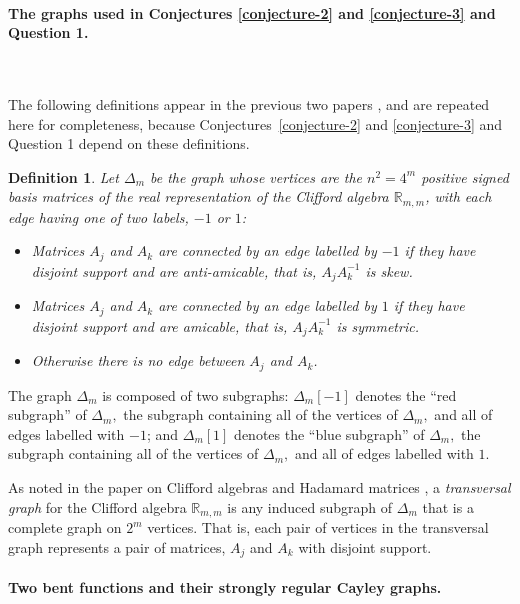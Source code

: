 \documentclass[12pt,a4paper]{article}
\newcommand{\mb}[1]{\mathbb{#1}}
\newcommand{\R}{\mb{R}}
\newtheorem{Definition}{Definition}
\begin{document}
\paragraph*{The graphs used in Conjectures \ref{conjecture-2} and \ref{conjecture-3} and Question 1.}
\label{sec-Graphs}

~

The following definitions appear in the previous two papers \cite{Leo14Constructions,Leo15Bent},
and are repeated here for completeness, because Conjectures~\ref{conjecture-2} and \ref{conjecture-3} and Question 1 depend on these definitions.

\begin{Definition}\label{definition-delta}
Let $\varDelta_m$ be the graph whose vertices are the $n^2=4^m$ 
positive signed basis matrices of the real representation
of the Clifford algebra $\R_{m,m}$,
with each edge having one of two labels, $-1$ or $1$:
\begin{itemize}
\item 
Matrices $A_j$ and $A_k$ are connected by an edge labelled by $-1$ if they have disjoint support and are anti-amicable,
that is, $A_j A_k^{-1}$ is skew.
\item 
Matrices $A_j$ and $A_k$ are connected by an edge labelled by $1$ if they have disjoint support and are amicable,
that is, $A_j A_k^{-1}$ is symmetric.
\item 
Otherwise there is no edge between $A_j$ and $A_k$.
\end{itemize}
\end{Definition}

The graph $\varDelta_m$ is composed
of two subgraphs:
$\varDelta_m[-1]$ denotes the ``red subgraph'' of $\varDelta_m,$
the subgraph containing all of the vertices of $\varDelta_m,$ and all of edges labelled with $-1$;
and $\varDelta_m[1]$ denotes the ``blue subgraph'' of $\varDelta_m,$
the subgraph containing all of the vertices of $\varDelta_m,$ and all of edges labelled with $1$.

As noted in the paper on Clifford algebras and Hadamard matrices \cite{Leo14Constructions},
a \emph{transversal graph} for the Clifford algebra $\R_{m,m}$
is any induced subgraph of $\varDelta_m$ that is a complete graph on $2^m$ vertices.
That is, each pair of vertices in the transversal graph represents a pair of matrices,
$A_j$ and $A_k$ with disjoint support.
\paragraph*{Two bent functions and their strongly regular Cayley graphs.}
\label{sec-Bent}
\end{document}
